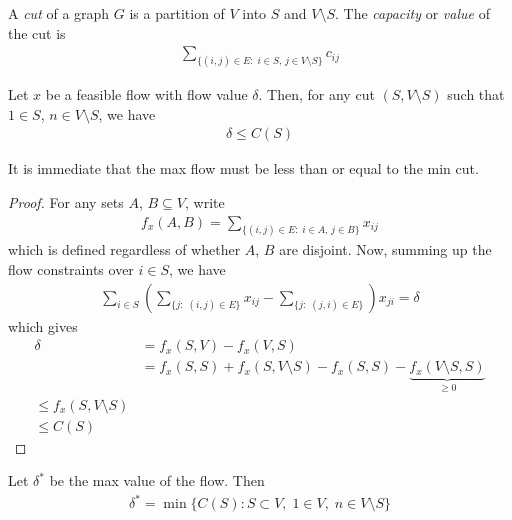\documentclass{../../template/note}
\begin{document}
    \begin{definition}[Cuts]
        A \emph{cut} of a graph $G$ is a partition of $V$ into $S$ and $V \setminus S$. The \emph{capacity} or \emph{value} of the cut is
        \begin{align*}
            \sum_{\{(i, j) \in E:\; i \in S,\, j \in V \setminus S\}} c_{ij}
        \end{align*}
    \end{definition}
    
    \begin{theorem}
        Let $x$ be a feasible flow with flow value $\delta$. Then, for any cut $(S, V \setminus S)$ such that $1 \in S$, $n \in V \setminus S$, we have
        \begin{align*}
            \delta \leq C(S)
        \end{align*}
    \end{theorem}
    
    \begin{remark*}
        It is immediate that the max flow must be less than or equal to the min cut.
    \end{remark*}
    
    \begin{proof}
        For any sets $A$, $B \subseteq V$, write
        \begin{align*}
            f_x(A, B) = \sum_{\{(i, j) \in E:\; i \in A,\, j \in B\}} x_{ij}
        \end{align*}
        which is defined regardless of whether $A$, $B$ are disjoint. Now, summing up the flow constraints over $i \in S$, we have
        \begin{align*}
            \sum_{i \in S} \left(\sum_{\{j:\;(i, j) \in E\}} x_{ij} - \sum_{\{j:\;(j, i) \in E\}}\right) x_{ji} = \delta
        \end{align*}
        which gives
        \begin{align*}
            \delta &= f_x(S, V) - f_x(V, S) \\
            &= f_x(S, S) + f_x(S, V \setminus S) - f_x(S, S) - \underbrace{f_x(V \setminus S, S)}_{\geq 0} \\
            \leq f_x(S, V \setminus S) \\
            \leq C(S)
        \end{align*}
    \end{proof}
    
    \begin{theorem}
        Let $\delta^*$ be the max value of the flow. Then
        \begin{align*}
            \delta^* = \min \{C(S): S \subset V,\; 1 \in V,\; n \in V \setminus S\}
        \end{align*}
    \end{theorem}
    
\end{document}
